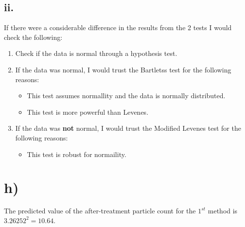 \documentclass{article}
\begin{document}
\subsection*{ii.}
If there were a considerable difference in the results from the 2 tests I would check the following:
\begin{enumerate}
    \item Check if the data is normal through a hypothesis test.
    \item If the data was normal, I would trust the Bartletss test for the following reasons:
    \begin{itemize}
        \item This test assumes normallity and the data is normally distributed.
        \item This test is more powerful than Levenes.
    \end{itemize}
    \item If the data was \textbf{not} normal, I would trust the Modified Levenes test for the following reasons:
    \begin{itemize}
        \item This test is robust for normaility.
    \end{itemize}
\end{enumerate}

\clearpage
\section*{h)}

The predicted value of the after-treatment particle count for the $1^{st}$ method is $3.26252^2 = 10.64$.
\end{document}
